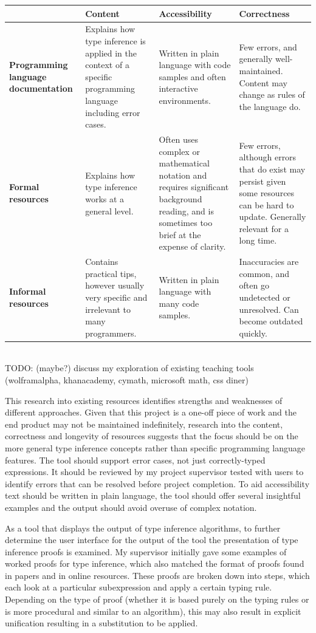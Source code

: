 \documentclass[a4paper,fleqn,oneside,12pt]{report}
\begin{document}
\begin{adjustbox}{center}\begin{tabular}{ |l|l|l|l| }
  \hline
   & \textbf{Content} & \textbf{Accessibility} & \textbf{Correctness} \\
  \hline
  \textbf{Programming language documentation} & Explains how type inference is applied in the context of a specific programming language including error cases. & Written in plain language with code samples and often interactive environments. & Few errors, and generally well-maintained. Content may change as rules of the language do. \\
  \hline
  \textbf{Formal resources} & Explains how type inference works at a general level. & Often uses complex or mathematical notation and requires significant background reading, and is sometimes too brief at the expense of clarity. & Few errors, although errors that do exist may persist given some resources can be hard to update. Generally relevant for a long time. \\
  \hline
  \textbf{Informal resources} & Contains practical tips, however usually very specific and irrelevant to many programmers. & Written in plain language with many code samples. & Inaccuracies are common, and often go undetected or unresolved. Can become outdated quickly. \\
  \hline
\end{tabular}\end{adjustbox}\\

TODO: (maybe?) discuss my exploration of existing teaching tools (wolframalpha, khanacademy, cymath, microsoft math, css diner)

This research into existing resources identifies strengths and weaknesses of different approaches. Given that this project is a one-off piece of work and the end product may not be maintained indefinitely, research into the content, correctness and longevity of resources suggests that the focus should be on the more general type inference concepts rather than specific programming language features. The tool should support error cases, not just correctly-typed expressions. It should be reviewed by my project supervisor tested with users to identify errors that can be resolved before project completion. To aid accessibility text should be written in plain language, the tool should offer several insightful examples and the output should avoid overuse of complex notation.

As a tool that displays the output of type inference algorithms, to further determine the user interface for the output of the tool the presentation of type inference proofs is examined. My supervisor initially gave some examples of worked proofs for type inference, which also matched the format of proofs found in papers and in online resources. These proofs are broken down into steps, which each look at a particular subexpression and apply a certain typing rule. Depending on the type of proof (whether it is based purely on the typing rules or is more procedural and similar to an algorithm), this may also result in explicit unification resulting in a substitution to be applied.
\end{document}
